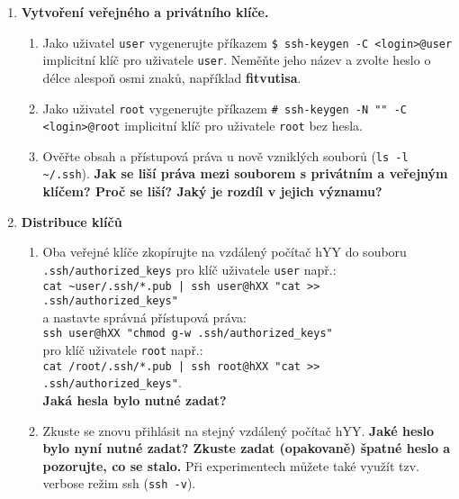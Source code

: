 \documentclass[a4paper,11pt]{article}
\begin{document}
\begin{enumerate}
\begin{enumerate}
    \end{enumerate}

  \item {\bf Vytvoření veřejného a privátního klíče.}

    \begin{enumerate}

      \item Jako uživatel {\tt user} vygenerujte příkazem \verb|$ ssh-keygen -C <login>@user|
        implicitní klíč pro uživatele
        {\tt user}. Neměňte jeho
        název a zvolte heslo o délce alespoň osmi znaků, například
        \textbf{fitvutisa}.

      \item Jako uživatel {\tt root} vygenerujte příkazem \verb|# ssh-keygen -N "" -C <login>@root|
        implicitní klíč pro uživatele {\tt root} bez hesla.

      \item Ověřte obsah a přístupová práva u nově vzniklých souborů (\verb|ls -l ~/.ssh|). {\bf Jak
se liší práva mezi souborem s privátním a veřejným klíčem? Proč se liší? Jaký je rozdíl v jejich významu?}

    \end{enumerate}

  \item {\bf Distribuce klíčů}

    \begin{enumerate}

      \item Oba veřejné klíče zkopírujte na vzdálený počítač hYY do
        souboru \verb|.ssh/authorized_keys|
        pro klíč uživatele {\tt user} např.: \\
        {\verb&cat ~user/.ssh/*.pub | ssh user@hXX "cat >> .ssh/authorized_keys"&}\\
        a nastavte správná přístupová práva:\\
        {\verb&ssh user@hXX "chmod g-w .ssh/authorized_keys"&} \\
        pro klíč uživatele {\tt root} např.: \\
        {\verb&cat /root/.ssh/*.pub | ssh root@hXX "cat >> .ssh/authorized_keys"&}. \\
      {\bf Jaká hesla bylo nutné zadat?}

      \item Zkuste se znovu přihlásit na stejný vzdálený počítač hYY. {\bf Jaké heslo bylo nyní nutné zadat? Zkuste
        zadat (opakovaně) špatné heslo a pozorujte, co se stalo.} Při experimentech můžete také
využít tzv. verbose režim ssh ({\tt ssh -v}).


\end{enumerate}
\end{enumerate}
\end{document}
